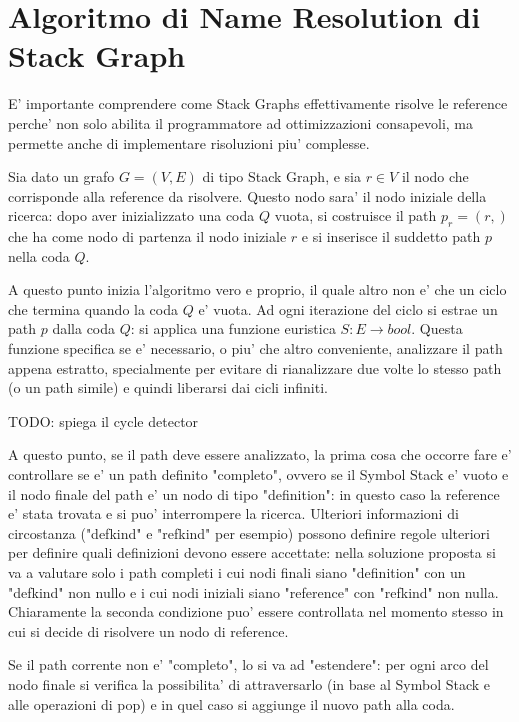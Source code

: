 \section{Algoritmo di Name Resolution di Stack Graph}

E' importante comprendere come Stack Graphs effettivamente risolve le reference perche' non solo abilita il programmatore ad ottimizzazioni consapevoli, ma permette anche di implementare risoluzioni piu' complesse.

\par
Sia dato un grafo $G = (V, E)$ di tipo Stack Graph, e sia $r \in V$ il nodo che corrisponde alla reference da risolvere. Questo nodo sara' il nodo iniziale della ricerca: dopo aver inizializzato una coda $Q$ vuota, si costruisce il path $p_r = (r,)$ che ha come nodo di partenza il nodo iniziale $r$ e si inserisce il suddetto path $p$ nella coda $Q$.

\par
A questo punto inizia l'algoritmo vero e proprio, il quale altro non e' che un ciclo che termina quando la coda $Q$ e' vuota.
Ad ogni iterazione del ciclo si estrae un path $p$ dalla coda $Q$: si applica una funzione euristica $S : E \rightarrow bool$.
Questa funzione specifica se e' necessario, o piu' che altro conveniente, analizzare il path appena estratto, specialmente per evitare di rianalizzare due volte lo stesso path (o un path simile) e quindi liberarsi dai cicli infiniti.

TODO: spiega il cycle detector

\par
A questo punto, se il path deve essere analizzato, la prima cosa che occorre fare e' controllare se e' un path definito "completo", ovvero se il Symbol Stack e' vuoto e il nodo finale del path e' un nodo di tipo "definition": in questo caso la reference e' stata trovata e si puo' interrompere la ricerca.
Ulteriori informazioni di circostanza ("defkind" e "refkind" per esempio) possono definire regole ulteriori per definire quali definizioni devono essere accettate: nella soluzione proposta si va a valutare solo i path completi i cui nodi finali siano "definition" con un "defkind" non nullo e i cui nodi iniziali siano "reference" con "refkind" non nulla. Chiaramente la seconda condizione puo' essere controllata nel momento stesso in cui si decide di risolvere un nodo di reference.

\par
Se il path corrente non e' "completo", lo si va ad "estendere": per ogni arco del nodo finale si verifica la possibilita' di attraversarlo (in base al Symbol Stack e alle operazioni di pop) e in quel caso si aggiunge il nuovo path alla coda.

